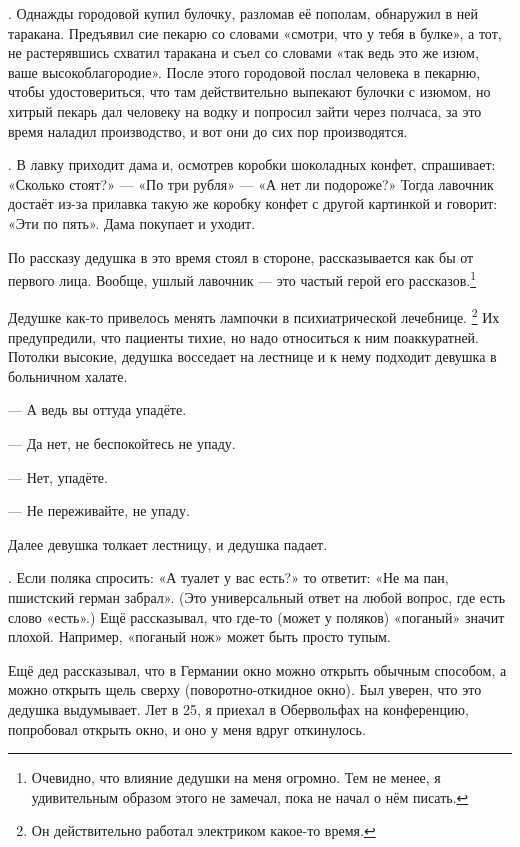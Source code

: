 \documentclass{book}
\begin{document}
.
Однажды городовой купил булочку, разломав её пополам, обнаружил в ней таракана.
Предъявил сие пекарю со словами «смотри, что у тебя в булке», а тот, не растерявшись схватил таракана и съел со словами «так ведь это же изюм, ваше высокоблагородие».
После этого городовой послал человека в пекарню, чтобы удостовериться, что там действительно выпекают булочки с изюмом, но хитрый пекарь дал человеку на водку и попросил зайти через полчаса, за это время наладил производство, и вот они до сих пор производятся.

.
В лавку приходит дама и, осмотрев коробки шоколадных конфет, спрашивает: «Сколько стоят?» --- «По три рубля» --- «А нет ли подороже?»
Тогда лавочник достаёт из-за прилавка такую же коробку конфет с другой картинкой и говорит: «Эти по пять».
Дама покупает и уходит.

По рассказу дедушка в это время стоял в стороне, рассказывается как бы от первого лица.
Вообще, ушлый лавочник --- это частый герой его рассказов.\footnote{Очевидно, что влияние дедушки на меня огромно.
Тем не менее, я удивительным образом этого не замечал, пока не начал о нём писать.}

 Дедушке как-то привелось менять лампочки в психиатрической лечебнице.%
\footnote{Он действительно работал электриком какое-то время.}
Их предупредили, что пациенты тихие, но надо относиться к ним поаккуратней.
Потолки высокие, дедушка восседает на лестнице и к нему подходит девушка в больничном халате.

--- А ведь вы оттуда упадёте.

--- Да нет, не беспокойтесь не упаду.

--- Нет, упадёте.

--- Не переживайте, не упаду.

Далее девушка толкает лестницу, и дедушка падает. 

.
Если поляка спросить: «А туалет у вас есть?»
то ответит: «Не ма пан, пшистский герман забрал».
(Это универсальный ответ на любой вопрос, где есть слово «есть».)
Ещё рассказывал, что где-то (может у поляков) «поганый» значит плохой.
Например, «поганый нож» может быть просто тупым.

Ещё дед рассказывал, что в Германии окно можно открыть обычным способом, а можно открыть щель сверху
(поворотно-откидное окно).
Был уверен, что это дедушка выдумывает.
Лет в 25, я приехал в Обервольфах на конференцию, попробовал открыть окно, и оно у меня вдруг откинулось.
\end{document}
